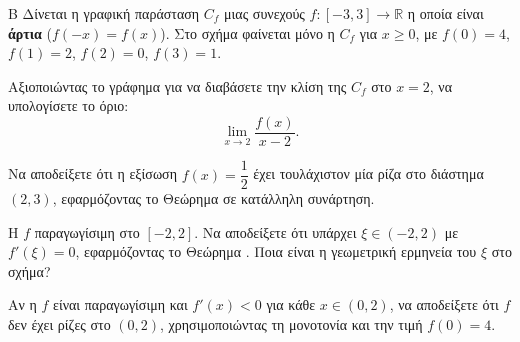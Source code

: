 
\begin{thema}{Β}
Δίνεται η γραφική παράσταση $C_f$ μιας συνεχούς $f:[-3, 3]\to\mathbb{R}$ η οποία είναι \textbf{άρτια} ($f(-x) = f(x)$). Στο σχήμα φαίνεται μόνο η $C_f$ για $x \geq 0$, με $f(0) = 4$, $f(1) = 2$, $f(2) = 0$, $f(3) = 1$.

\begin{center}
\end{center}

\begin{erwthma}
  \item Αξιοποιώντας το γράφημα για να διαβάσετε την κλίση της $C_f$ στο $x = 2$, να υπολογίσετε το όριο:
  \[ \lim\limits_{x \to 2} \frac{f(x)}{x - 2}. \]
  \item Να αποδείξετε ότι η εξίσωση $f(x) = \dfrac{1}{2}$ έχει τουλάχιστον μία ρίζα στο διάστημα $(2, 3)$, εφαρμόζοντας το Θεώρημα  σε κατάλληλη συνάρτηση.
  \item Η $f$ παραγωγίσιμη στο $[-2, 2]$. Να αποδείξετε ότι υπάρχει $\xi \in (-2, 2)$ με $f'(\xi) = 0$, εφαρμόζοντας το Θεώρημα . Ποια είναι η γεωμετρική ερμηνεία του $\xi$ στο σχήμα?
  \item Αν η $f$ είναι παραγωγίσιμη και $f'(x) < 0$ για κάθε $x \in (0, 2)$, να αποδείξετε ότι $f$ δεν έχει ρίζες στο $(0, 2)$, χρησιμοποιώντας τη μονοτονία και την τιμή $f(0) = 4$.
\end{erwthma}
\end{thema}

